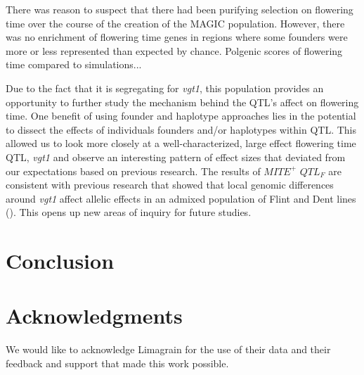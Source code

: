 \documentclass[article,9pt,twocolumn,twoside]{rilabRxiv}
\newcommand{\beginsupplement}{%
        \setcounter{table}{0}
        \renewcommand{\thetable}{S\arabic{table}}%
        \setcounter{figure}{0}
        \renewcommand{\thefigure}{S\arabic{figure}}%
     }
\begin{document}
There was reason to suspect that there had been purifying selection on flowering time over the course of the creation of the MAGIC population.
However, there was no enrichment of flowering time genes in regions where some founders were more or less represented than expected by chance.
Polgenic scores of flowering time compared to simulations...

Due to the fact that it is segregating for \emph{vgt1}, this population provides an opportunity to further study the mechanism behind the QTL's affect on flowering time.
One benefit of using founder and haplotype approaches lies in the potential to dissect the effects of individuals founders and/or haplotypes within QTL.
This allowed us to look more closely at a well-characterized, large effect flowering time QTL, \emph{vgt1} and observe an interesting pattern of effect sizes that deviated from our expectations based on previous research.
The results of $MITE^+$ $QTL_F$ are consistent with previous research that showed that local genomic differences around \emph{vgt1} affect allelic effects in an admixed population of Flint and Dent lines (\cite{Rio}).
This opens up new areas of inquiry for future studies.


\section{Conclusion}



\section{Acknowledgments}
We would like to acknowledge Limagrain for the use of their data and their feedback and support that made this work possible.



\onecolumn
\beginsupplement
\end{document}
